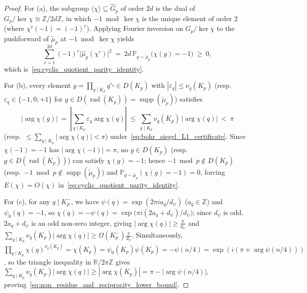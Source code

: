 \documentclass[11pt, a4paper]{article}
\theoremstyle{plain}
\theoremstyle{definition}
\newcommand{\Z}{\mathbb{Z}}
\newcommand{\R}{\mathbb{R}}
\begin{document}
\begin{proof}
For (a), the subgroup $\langle\chi\rangle\subseteq\widehat{G}_p$ of order $2d$ is the dual of $G_p/\ker\chi\cong\Z/2d\Z$, in which $-1\bmod\ker\chi$ is the unique element of order $2$ (where $\chi^{r}(-1)=(-1)^{r}$). Applying Fourier inversion on $G_p/\ker\chi$ to the pushforward of $\widetilde{\mu}_p$ at $-1\bmod\ker\chi$ yields
\[
\sum_{r=1}^{2d}(-1)^{r}\big|\widehat{\mu}_p(\chi^{r})\big|^{2}\ =\ 2d\,\mathbb{P}_{g\sim\widetilde{\mu}_p}\!\big(\chi(g)=-1\big)\ \ge\ 0,
\]
which is~\eqref{eq:cyclic_quotient_parity_identity}.

For (b), every element $g=\prod_{q\mid K_p}q^{\varepsilon_q}\in D(K_p)$ with $|\varepsilon_q|\le\nu_q(K_p)$ (resp.\ $\varepsilon_q\in\{-1,0,+1\}$ for $g\in D(\operatorname{rad}(K_p))=\operatorname{supp}(\widetilde{\mu}_p)$) satisfies
\[
\big|\arg\chi(g)\big|\ =\ \left|\sum_{q\mid K_p}\varepsilon_q\arg\chi(q)\right|\ \le\ \sum_{q\mid K_p}\nu_q(K_p)\,\big|\arg\chi(q)\big|\ <\ \pi
\]
(resp.\ $\le\sum_{q\mid K_p}|\arg\chi(q)|<\pi$) under~\eqref{eq:bohr_siegel_L1_certificate}. Since $\chi(-1)=-1$ has $|\arg\chi(-1)|=\pi$, no $g\in D(K_p)$ (resp.\ $g\in D(\operatorname{rad}(K_p))$) can satisfy $\chi(g)=-1$; hence $-1\bmod p\notin D(K_p)$ (resp.\ $-1\bmod p\notin\operatorname{supp}(\widetilde{\mu}_p)$) and $\mathbb{P}_{g\sim\widetilde{\mu}_p}(\chi(g)=-1)=0$, forcing $E(\chi)=O(\chi)$ in~\eqref{eq:cyclic_quotient_parity_identity}.

For (c), for any $q\mid K_p^{-}$, we have $\psi(q)=\exp(2\pi i a_q/d_{\psi})$ ($a_q\in\Z$) and $\psi_0(q)=-1$, so $\chi(q)=-\psi(q)=\exp\big(\pi i(2a_q+d_{\psi})/d_{\psi}\big)$; since $d_{\psi}$ is odd, $2a_q+d_{\psi}$ is an odd non-zero integer, giving $|\arg\chi(q)|\ge\frac{\pi}{d_{\psi}}$ and $\sum_{q\mid K_p}\nu_q(K_p)|\arg\chi(q)|\ge\Omega(K_p^{-})\frac{\pi}{d_{\psi}}$. Simultaneously, $\prod_{q\mid K_p}\chi(q)^{\nu_q(K_p)}=\chi(K_p)=\psi_0(K_p)\psi(K_p)=-\psi(n/4)=\exp(i(\pi+\arg\psi(n/4)))$, so the triangle inequality in $\R/2\pi\Z$ gives $\sum_{q\mid K_p}\nu_q(K_p)|\arg\chi(q)|\ge|\arg\chi(K_p)|=\pi-|\arg\psi(n/4)|$, proving~\eqref{eq:non_residue_and_reciprocity_lower_bound}.
\end{proof}
\end{document}
